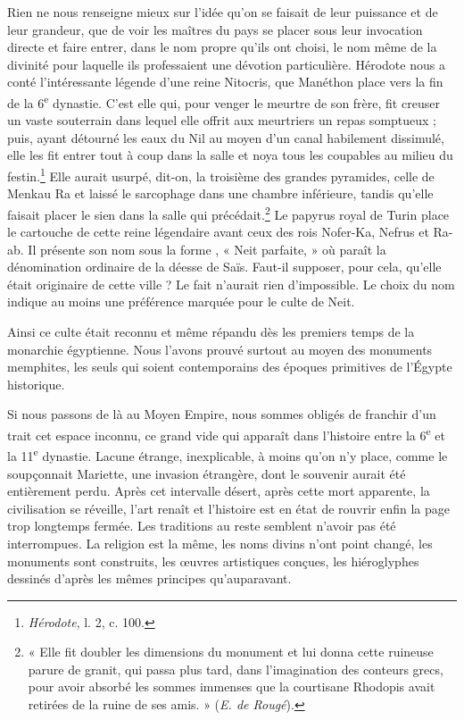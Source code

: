\documentclass[letterpaper,twocolumn,openany,nodeprecatedcode]{dndbook}
\newcommand*\hieroAAUU{}
\begin{document}
Rien ne nous renseigne mieux sur l'idée qu'on se faisait de leur puissance et de leur grandeur, que de voir les maîtres du pays se placer sous leur invocation directe et faire entrer, dans le nom propre qu'ils ont choisi, le nom même de la divinité pour laquelle ils professaient une dévotion particulière. Hérodote nous a conté l'intéressante légende d'une reine Nitocris, que Manéthon place vers la fin de la 6\textsuperscript{e} dynastie. C'est elle qui, pour venger le meurtre de son frère, fit creuser un vaste souterrain dans lequel elle offrit aux meurtriers un repas somptueux ; puis, ayant détourné les eaux du Nil au moyen d'un canal habilement dissimulé, elle les fit entrer tout à coup dans la salle et noya tous les coupables au milieu du festin.\footnote{\emph{Hérodote}, l. 2, c. 100.} Elle aurait usurpé, dit-on, la troisième des grandes pyramides, celle de Menkau Ra et laissé le sarcophage dans une chambre inférieure, tandis qu’elle faisait placer le sien dans la salle qui précédait.\footnote{« Elle fit doubler les dimensions du monument et lui donna cette ruineuse parure de granit, qui passa plus tard, dans l'imagination des conteurs grecs, pour avoir absorbé les sommes immenses que la courtisane Rhodopis avait retirées de la ruine de ses amis. » (\emph{E. de Rougé}).} Le papyrus royal de Turin place le cartouche de cette reine légendaire avant ceux des rois Nofer-Ka, Nefrus et Ra-ab. Il présente son nom sous la forme $\hieroAAUU$, « Neit parfaite, » où paraît la dénomination ordinaire de la déesse de Saïs. Faut-il supposer, pour cela, qu'elle était originaire de cette ville ? Le fait n'aurait rien d'impossible. Le choix du nom indique au moins une préférence marquée pour le culte de Neit.

Ainsi ce culte était reconnu et même répandu dès les premiers temps de la monarchie égyptienne. Nous l'avons prouvé surtout au moyen des monuments memphites, les seuls qui soient contemporains des époques primitives de l'Égypte historique.

Si nous passons de là au Moyen Empire, nous sommes obligés de franchir d'un trait cet espace inconnu, ce grand vide qui apparaît dans l'histoire entre la 6\textsuperscript{e} et la 11\textsuperscript{e} dynastie. Lacune étrange, inexplicable, à moins qu'on n'y place, comme le soupçonnait Mariette, une invasion étrangère, dont le souvenir aurait été entièrement perdu. Après cet intervalle désert, après cette mort apparente, la civilisation se réveille, l'art renaît et l'histoire est en état de rouvrir enfin la page trop longtemps fermée. Les traditions au reste semblent n'avoir pas été interrompues. La religion est la même, les noms divins n'ont point changé, les monuments sont construits, les œuvres artistiques conçues, les hiéroglyphes dessinés d'après les mêmes principes qu'auparavant.
\end{document}
